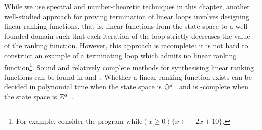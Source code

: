 While we use spectral and number-theoretic techniques in this chapter,
another well-studied approach for proving termination of linear loops
involves designing linear ranking functions, that is, linear functions
from the state space to a well-founded domain such that each iteration
of the loop strictly decreases the value of the ranking
function. However, this approach is incomplete: it is not hard to
construct an example of a terminating loop which admits no linear
ranking function\footnote{For example,
consider the program $\mbox{while}(x \geq 0) \lbrace x \leftarrow -2x+10 \rbrace$.}.
Sound and relatively complete methods for
synthesising linear ranking functions can be found in
\cite{PodelskiR04} and~\cite{Ben-AmramG13}. Whether a linear
ranking function exists can be decided in polynomial time when the
state space is $\mathbb{Q}^{d}$~\cite{PodelskiR04} and is \coNP-complete when the
state space is $\mathbb{Z}^{d}$~\cite{Ben-AmramG13}.
